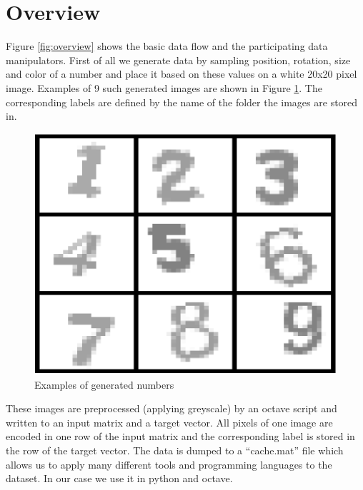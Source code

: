 \documentclass{article}
\begin{document}
\section{Overview}
Figure \ref{fig:overview} shows the basic data flow and the participating data manipulators. First of all we generate data by sampling position, rotation, size and color of a number and place it based on these values on a white 20x20 pixel image. Examples of 9 such generated images are shown in Figure \ref{fig:generated_numbers}. The corresponding labels are defined by the name of the folder the images are stored in.
\begin{figure}[ht]
	\centerline{\includegraphics[scale=0.25]{../examples}}
	\caption{Examples of generated numbers}
	\label{fig:generated_numbers}
\end{figure}
These images are preprocessed (applying greyscale) by an octave script and written to an input matrix and a target vector. All pixels of one image are encoded in one row of the input matrix and the corresponding label is stored in the row of the target vector. The data is dumped to a ``cache.mat'' file which allows us to apply many different tools and programming languages to the dataset. In our case we use it in python and octave.
\end{document}
